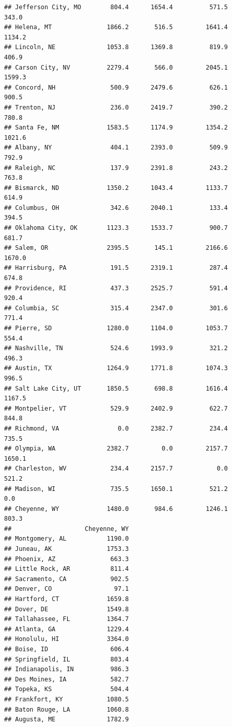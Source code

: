 \documentclass[
]{article}
\begin{document}
\begin{verbatim}
## Jefferson City, MO        804.4      1654.4          571.5       343.0
## Helena, MT               1866.2       516.5         1641.4      1134.2
## Lincoln, NE              1053.8      1369.8          819.9       406.9
## Carson City, NV          2279.4       566.0         2045.1      1599.3
## Concord, NH               500.9      2479.6          626.1       900.5
## Trenton, NJ               236.0      2419.7          390.2       780.8
## Santa Fe, NM             1583.5      1174.9         1354.2      1021.6
## Albany, NY                404.1      2393.0          509.9       792.9
## Raleigh, NC               137.9      2391.8          243.2       763.8
## Bismarck, ND             1350.2      1043.4         1133.7       614.9
## Columbus, OH              342.6      2040.1          133.4       394.5
## Oklahoma City, OK        1123.3      1533.7          900.7       681.7
## Salem, OR                2395.5       145.1         2166.6      1670.0
## Harrisburg, PA            191.5      2319.1          287.4       674.8
## Providence, RI            437.3      2525.7          591.4       920.4
## Columbia, SC              315.4      2347.0          301.6       771.4
## Pierre, SD               1280.0      1104.0         1053.7       554.4
## Nashville, TN             524.6      1993.9          321.2       496.3
## Austin, TX               1264.9      1771.8         1074.3       996.5
## Salt Lake City, UT       1850.5       698.8         1616.4      1167.5
## Montpelier, VT            529.9      2402.9          622.7       844.8
## Richmond, VA                0.0      2382.7          234.4       735.5
## Olympia, WA              2382.7         0.0         2157.7      1650.1
## Charleston, WV            234.4      2157.7            0.0       521.2
## Madison, WI               735.5      1650.1          521.2         0.0
## Cheyenne, WY             1480.0       984.6         1246.1       803.3
##                    Cheyenne, WY
## Montgomery, AL           1190.0
## Juneau, AK               1753.3
## Phoenix, AZ               663.3
## Little Rock, AR           811.4
## Sacramento, CA            902.5
## Denver, CO                 97.1
## Hartford, CT             1659.8
## Dover, DE                1549.8
## Tallahassee, FL          1364.7
## Atlanta, GA              1229.4
## Honolulu, HI             3364.0
## Boise, ID                 606.4
## Springfield, IL           803.4
## Indianapolis, IN          986.3
## Des Moines, IA            582.7
## Topeka, KS                504.4
## Frankfort, KY            1080.5
## Baton Rouge, LA          1060.8
## Augusta, ME              1782.9

\end{verbatim}
\end{document}
